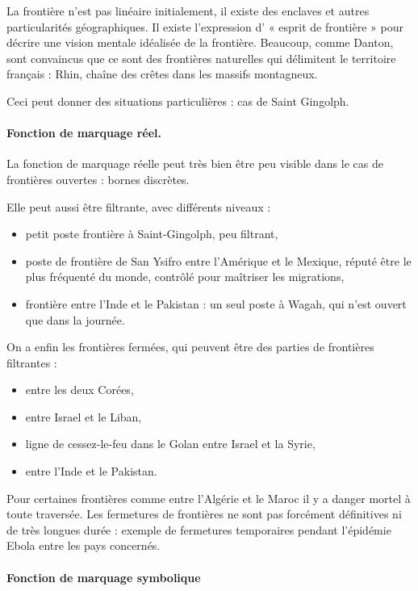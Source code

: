 \documentclass[a4paper,10pt]{article}
\begin{document}
		La frontière n'est pas linéaire initialement, il existe des enclaves et autres particularités géographiques.
		Il existe l'expression d' « esprit de frontière » pour décrire une vision mentale idéalisée de la frontière.
		Beaucoup, comme Danton, sont convaincus que ce sont des frontières naturelles qui délimitent le territoire français : Rhin, chaîne des crêtes dans les massifs montagneux.

		Ceci peut donner des situations particulières : cas de Saint Gingolph.

		\paragraph{Fonction de marquage réel.}

		La fonction de marquage réelle peut très bien être peu visible dans le cas de frontières ouvertes : bornes discrètes.

		Elle peut aussi être filtrante, avec différents niveaux :
		\begin{itemize}
		\item petit poste frontière à Saint-Gingolph, peu filtrant,
		\item poste de frontière de San Ysifro entre l'Amérique et le Mexique, réputé être le plus fréquenté du monde, contrôlé pour maîtriser les migrations,
		\item frontière entre l'Inde et le Pakistan : un seul poste à Wagah, qui n'est ouvert que dans la journée.
		\end{itemize}

		On a enfin les frontières fermées, qui peuvent être des parties de frontières filtrantes :
		\begin{itemize}
		\item entre les deux Corées,
		\item entre Israel et le Liban,
		\item ligne de cessez-le-feu dans le Golan entre Israel et la Syrie,
		\item entre l'Inde et le Pakistan.
		\end{itemize}

		Pour certaines frontières comme entre l'Algérie et le Maroc il y a danger mortel à toute traversée.
		Les fermetures de frontières ne sont pas forcément définitives ni de très longues durée : exemple de fermetures temporaires pendant l'épidémie Ebola entre les pays concernés.

		\paragraph{Fonction de marquage symbolique}
\end{document}
